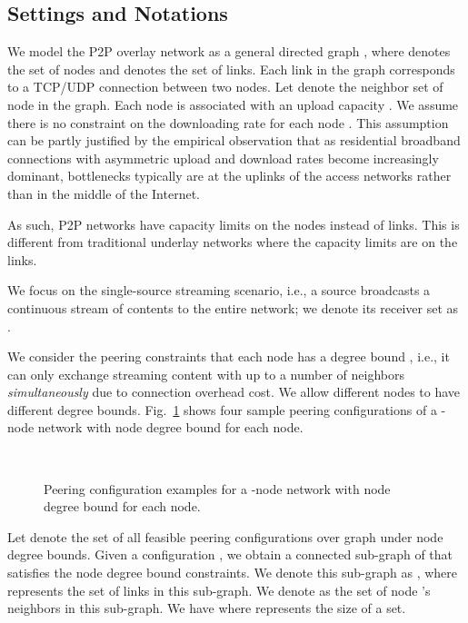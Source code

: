 \documentclass[10pt,conference]{IEEEtran}
\begin{document}
\label{sec:prob.formulation}


\subsection{Settings and Notations}

We model the P2P overlay network as a general directed graph , where
\emph{} denotes the set of nodes and \emph{} denotes the set
of links. Each link in the graph corresponds to a TCP/UDP
connection between two nodes. Let  denote the neighbor set of node  in the graph. Each node  is associated
with an upload capacity . We assume there is no constraint on the downloading
rate for each node . This assumption can be partly justified
by the empirical observation that as residential broadband
connections with asymmetric upload and download rates become increasingly dominant, bottlenecks
typically are at the uplinks of the access networks rather than
in the middle of the Internet.

As such, P2P networks have capacity limits on the nodes instead of links. This is different from traditional underlay networks where the capacity limits are on the links.

We focus on the single-source streaming scenario, i.e., a source
 broadcasts a continuous stream of contents to the entire network; we
denote its receiver set as .

We consider the peering constraints that each node has a degree bound
, i.e., it can only exchange streaming content
with up to a  number of neighbors \emph{simultaneously} due to connection overhead cost.
We allow different nodes to have different degree bounds.
Fig.~\ref{fig:pc} shows four sample peering configurations of a -node
network with node degree bound  for each node.

\begin{figure}[hbt!]
\centering
{}
\\
\caption{Peering configuration examples for a -node network with node degree bound  for each node.}
\label{fig:pc}
\end{figure}

Let  denote the set of all feasible peering configurations
over graph  under node degree bounds. Given a configuration , we obtain a
connected sub-graph of  that satisfies the node degree bound constraints. We denote this sub-graph as , where 
represents the set of links in this sub-graph. We denote 
as the set of node 's neighbors in this sub-graph. We have 
where  represents the size of a set.
\end{document}
